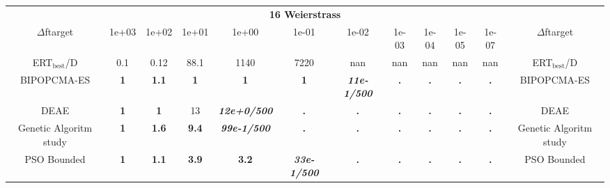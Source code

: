 \begin{tabular}{cccccccccccc}
 & \multicolumn{10}{c}{{\normalsize \textbf{16 Weierstrass}}}\\
$\Delta$ftarget& 1e+03& 1e+02& 1e+01& 1e+00& 1e-01& 1e-02& 1e-03& 1e-04& 1e-05& 1e-07 & $\Delta$ftarget \\
ERT$_{\textrm{best}}$/D& 0.1& 0.12& 88.1& 1140& 7220& nan& nan& nan& nan& nan & ERT$_{\textrm{best}}$/D \\
\hline
BIPOPCMA-ES & \textbf{1} & \textbf{1.1} & \textbf{1} & \textbf{1} & \textbf{1} & \textbf{\textit{11e-1}\textit{/500}} & \textbf{.} & \textbf{.} & \textbf{.} & \textbf{.} & BIPOPCMA-ES \cite{add_an_entry_for_BIPOPCMA-ES_in_bbob.bib}\\
DEAE & \textbf{1} & \textbf{1} & 13 & \textbf{\textit{12e+0}\textit{/500}} & \textbf{.} & \textbf{.} & \textbf{.} & \textbf{.} & \textbf{.} & \textbf{.} & DEAE \cite{add_an_entry_for_DEAE_in_bbob.bib}\\
Genetic Algoritm study & \textbf{1} & \textbf{1.6} & \textbf{9.4} & \textbf{\textit{99e-1}\textit{/500}} & \textbf{.} & \textbf{.} & \textbf{.} & \textbf{.} & \textbf{.} & \textbf{.} & Genetic Algoritm study \cite{add_an_entry_for_Genetic Algoritm study_in_bbob.bib}\\
PSO Bounded & \textbf{1} & \textbf{1.1} & \textbf{3.9} & \textbf{3.2} & \textbf{\textit{33e-1}\textit{/500}} & \textbf{.} & \textbf{.} & \textbf{.} & \textbf{.} & \textbf{.} & PSO Bounded \cite{add_an_entry_for_PSO Bounded_in_bbob.bib}
\end{tabular}
